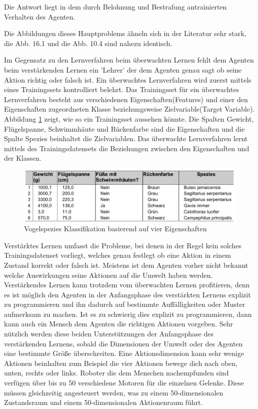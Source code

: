 Die Antwort liegt in dem durch Belohnung und Bestrafung antrainierten Verhalten des Agenten.

Die Abbildungen dieses Hauptproblems ähneln sich in der Literatur sehr stark, die Abb. 16.1 \cite[398]{Alpaydim} und die Abb. 10.4 \cite[290]{Ertel} sind nahezu identisch.

Im Gegensatz zu den Lernverfahren beim überwachten Lernen fehlt dem Agenten beim verstärkenden Lernen ein 'Lehrer' der dem Agenten genau sagt ob seine Aktion richtig oder falsch ist. Ein überwachtes Lernverfahren wird zuerst mittels eines Trainingssets kontrolliert belehrt. Das Trainingsset für ein überwachtes Lernverfahren besteht aus verschiedenen Eigenschaften(Features) und einer den Eigenschaften zugeordneten Klasse beziehungsweise Zielvariable(Target Variable). Abbildung \ref{fig:vogel_spezies} zeigt, wie so ein Trainingsset aussehen könnte\cite[8]{Harrington}. Die Spalten Gewicht, Flügelspanne, Schwimmhäute und Rückenfarbe sind die Eigenschaften und die Spalte Spezies beinhaltet die Zielvariablen. Das überwachte Lernverfahren lernt mittels des Trainingsdatensets die Beziehungen zwischen den Eigenschaften und der Klassen.   \\

\begin{figure}[!htbp]
  \centering
  \includegraphics[scale = 0.89]{inhalt/abbildungen/vogel_spezies.pdf}
  \caption{Vogelspezies Klassifikation basierend auf vier Eigenschaften}
  \label{fig:vogel_spezies}
\end{figure} 

Verstärktes Lernen umfasst die Probleme, bei denen in der Regel kein solches Trainingsdatenset vorliegt, welches genau festlegt ob eine Aktion in einem Zustand korrekt oder falsch ist. Meistens ist dem Agenten vorher nicht bekannt welche Auswirkungen seine Aktionen auf die Umwelt haben werden. Verstärkendes Lernen kann trotzdem vom überwachten Lernen profitieren, denn es ist möglich den Agenten in der Anfangsphase des verstärkten Lernens explizit zu programmieren und ihn dadurch auf bestimmte Auffälligkeiten oder Muster aufmerksam zu machen. Ist es zu schwierig dies explizit zu programmieren, dann kann auch ein Mensch dem Agenten die richtigen Aktionen vorgeben. Sehr nützlich werden diese beiden Unterstützungen der Anfangsphase des verstärkenden Lernens, sobald die Dimensionen der Umwelt oder des Agenten eine bestimmte Größe überschreiten. Eine Aktionsdimension kann sehr wenige Aktionen beinhalten zum Beispiel die vier Aktionen bewege dich nach oben, unten, rechts oder links. Roboter die dem Menschen nachempfunden sind verfügen über bis zu 50 verschiedene Motoren für die einzelnen Gelenke. Diese müssen gleichzeitig angesteuert werden, was zu einem 50-dimensionalen Zustandsraum und einem 50-dimensionalen Aktionenraum führt\cite[305\psq]{Ertel}.

